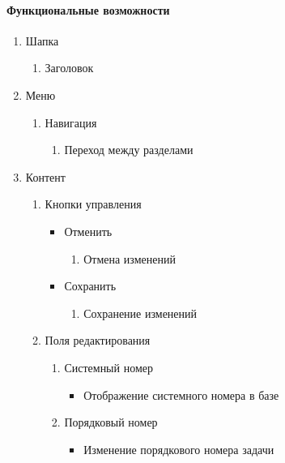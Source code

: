 \paragraph{Функциональные возможности}
\begin{enumerate}
	\item Шапка
	\begin{enumerate}
		\item Заголовок
	\end{enumerate}

	\item Меню
	\begin{enumerate}
		\item Навигация
		\begin{enumerate}
			\item Переход между разделами
		\end{enumerate}
	\end{enumerate}

	\item Контент
	\begin{enumerate}
		\item Кнопки управления
		\begin{itemize}
			\item Отменить
			\begin{enumerate}
				\item Отмена изменений
			\end{enumerate}

			\item Сохранить
			\begin{enumerate}
				\item Сохранение изменений
			\end{enumerate}
		\end{itemize}

		\item Поля редактирования
		\begin{enumerate}
			\item Системный номер
			\begin{itemize}
				\item Отображение системного номера в базе
			\end{itemize}

			\item Порядковый номер
			\begin{itemize}
				\item Изменение порядкового номера задачи
			\end{itemize}


\end{enumerate}
\end{enumerate}
\end{enumerate}
